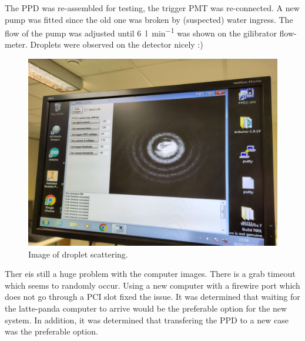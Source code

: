 

The PPD was re-assembled for testing, the trigger PMT was re-connected. A new pump was fitted since the old one was broken by (suspected) water ingress. The flow of the pump was adjusted until \SI{6}{\litre\per\minute} was shown on the gilibrator flow-meter. Droplets were observed on the detector nicely :)

\begin{figure}[H]
\begin{center}
\includegraphics[width=0.5\linewidth]{Figures/PPDDropletImage}
\end{center}
\caption{Image of droplet scattering.}
\label{fig:PPDDropletImage}
\end{figure}

Ther eis still a huge problem with the computer images. There is a grab timeout which seems to randomly occur. Using a new computer with a firewire port which does not go through a PCI slot fixed the issue. It was determined that waiting for the latte-panda computer to arrive would be the preferable option for the new system. In addition, it was determined that transfering the PPD to a new case was the preferable option.
